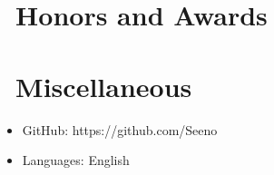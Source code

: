 \documentclass{resume}
\begin{document}
\section{\faHeartO\ Honors and Awards}

\section{\faInfo\ Miscellaneous}
\begin{itemize}[parsep=0.5ex]
  \item GitHub: https://github.com/Seeno
  \item Languages: English
\end{itemize}

%
%
\end{document}
